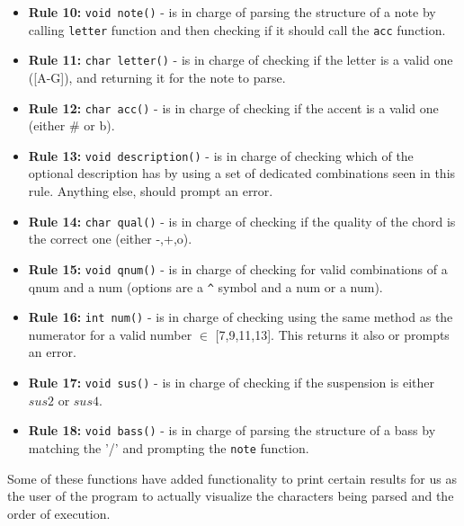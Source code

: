 \documentclass{article}
\begin{document}
\begin{itemize}
    \item \textbf{Rule 10:} \texttt{void note()} - is in charge of parsing the structure of a note by calling \texttt{letter} function and then checking if it should call the \texttt{acc} function.
    \item \textbf{Rule 11:} \texttt{char letter()} - is in charge of checking if the letter is a valid one ([A-G]), and returning it for the note to parse.
    \item \textbf{Rule 12:} \texttt{char acc()} - is in charge of checking if the accent is a valid one (either \# or b).
    \item \textbf{Rule 13:} \texttt{void description()} - is in charge of checking which of the optional description has by using a set of dedicated combinations seen in this rule. Anything else, should prompt an error.
    \item \textbf{Rule 14:} \texttt{char qual()} - is in charge of checking if the quality of the chord is the correct one (either -,+,o). 
    \item \textbf{Rule 15:} \texttt{void qnum()} - is in charge of checking for valid combinations of a qnum and a num (options are a \texttt{\^{}} symbol and a num or a num).
    \item \textbf{Rule 16:} \texttt{int num()} - is in charge of checking using the same method as the numerator for a valid number $\in$ [7,9,11,13]. This returns it also or prompts an error.
    \item \textbf{Rule 17:} \texttt{void sus()} - is in charge of checking if the suspension is either $sus2$ or $sus4$.
    \item \textbf{Rule 18:} \texttt{void bass()} - is in charge of parsing the structure of a bass by matching the '/' and prompting the \texttt{note} function.
\end{itemize}
\indent Some of these functions have added functionality to print certain results for us as the user of the program to actually visualize the characters being parsed and the order of execution.
\end{document}
